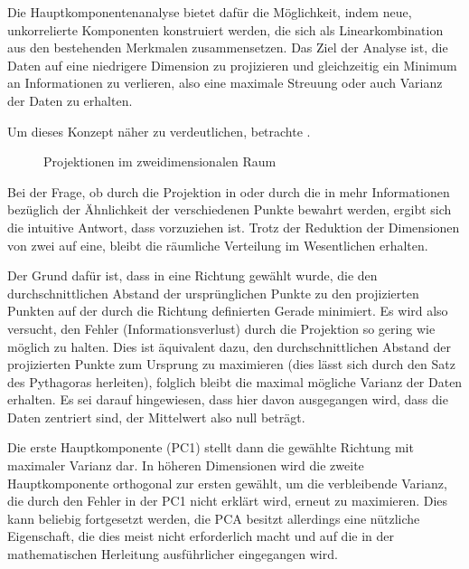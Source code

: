 Die Hauptkomponentenanalyse bietet dafür die Möglichkeit, indem neue, unkorrelierte Komponenten konstruiert werden, die sich als Linearkombination aus den bestehenden Merkmalen zusammensetzen.
Das Ziel der Analyse ist, die Daten auf eine niedrigere Dimension zu projizieren und gleichzeitig ein Minimum an Informationen zu verlieren, also eine maximale Streuung oder auch Varianz der Daten zu erhalten.

Um dieses Konzept näher zu verdeutlichen, betrachte .
\begin{figure}[bt]
    \centering
    \begin{subfigure}{\textwidth}
        \centering
        \caption{}\label{fig:pca2d1}
        
        \hspace{20pt}
        
    \end{subfigure}
    \begin{subfigure}{\textwidth}
        \centering
        \caption{}\label{fig:pca2d2}
        
        \hspace{20pt}
        
    \end{subfigure}
    \caption{Projektionen im zweidimensionalen Raum}\label{fig:pca2d}
\end{figure}
Bei der Frage, ob durch die Projektion in  oder durch die in  mehr Informationen bezüglich der Ähnlichkeit der verschiedenen Punkte bewahrt werden, ergibt sich die intuitive Antwort, dass  vorzuziehen ist.
Trotz der Reduktion der Dimensionen von zwei auf eine, bleibt die räumliche Verteilung im Wesentlichen erhalten.

Der Grund dafür ist, dass in  eine Richtung gewählt wurde, die den durchschnittlichen Abstand der ursprünglichen Punkte zu den projizierten Punkten auf der durch die Richtung definierten Gerade minimiert.
Es wird also versucht, den Fehler (Informationsverlust) durch die Projektion so gering wie möglich zu halten.
Dies ist äquivalent dazu, den durchschnittlichen Abstand der projizierten Punkte zum Ursprung zu maximieren (dies lässt sich durch den Satz des Pythagoras herleiten), folglich bleibt die maximal mögliche Varianz der Daten erhalten.
Es sei darauf hingewiesen, dass hier davon ausgegangen wird, dass die Daten zentriert sind, der Mittelwert also null beträgt.

Die erste Hauptkomponente (PC1) stellt dann die gewählte Richtung mit maximaler Varianz dar.
In höheren Dimensionen wird die zweite Hauptkomponente orthogonal zur ersten gewählt, um die verbleibende Varianz, die durch den Fehler in der PC1 nicht erklärt wird, erneut zu maximieren.
Dies kann beliebig fortgesetzt werden, die PCA besitzt allerdings eine nützliche Eigenschaft, die dies meist nicht erforderlich macht und auf die in der mathematischen Herleitung ausführlicher eingegangen wird.

